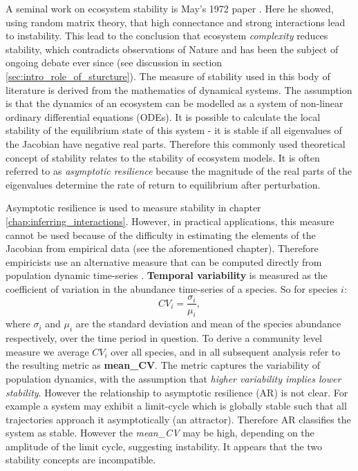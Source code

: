 A seminal work on ecosystem stability is May's 1972 paper \cite{may1972will}. Here he showed, using random matrix theory, that high connectance and strong interactions lead to instability. This lead to the conclusion that ecosystem \emph{complexity} reduces stability, which contradicts observations of Nature and has been the subject of ongoing debate ever since (see discussion in section \ref{sec:intro_role_of_sturcture}). The measure of stability used in this body of literature is derived from the mathematics of dynamical systems. The assumption is that the dynamics of an ecosystem can be modelled as a system of non-linear ordinary differential equations (ODEs). It is possible to calculate the local stability of the equilibrium state of this system - it is stable if all eigenvalues of the Jacobian have negative real parts. Therefore this commonly used theoretical concept of stability relates to the stability of ecosystem models. It is often referred to as \emph{asymptotic resilience} \cite{arnoldi2015} because the magnitude of the real parts of the eigenvalues determine the rate of return to equilibrium after perturbation. 

Asymptotic resilience is used to measure stability in chapter \ref{chap:inferring_interactions}. However, in practical applications, this measure cannot be used because of the difficulty in estimating the elements of the Jacobian from empirical data (see the aforementioned chapter). Therefore empiricists use an alternative measure that can be computed directly from population dynamic time-series \cite{campbell2011experimental, donohue2013dimensionality}. \textbf{Temporal variability} is measured as the coefficient of variation in the abundance time-series of a species. So for species $i$: 
\begin{equation}
CV_i = \frac{\sigma_i}{\mu_i},
\label{eq:cov}
\end{equation}
%
where $\sigma_i$ and $\mu_i$ are the standard deviation and mean of the species abundance respectively, over the time period in question. To derive a community level measure we average $CV_i$ over all species, and in all subsequent analysis refer to the resulting metric as \textbf{mean\_CV}. The metric captures the variability of population dynamics, with the assumption that \emph{higher variability implies lower stability}. However the relationship to asymptotic resilience (AR) is not clear. For example a system may exhibit a limit-cycle which is globally stable such that all trajectories approach it asymptotically (an attractor). Therefore AR classifies the system as stable. However the \emph{mean\_CV} may be high, depending on the amplitude of the limit cycle, suggesting instability. It appears that the two stability concepts are incompatible.



